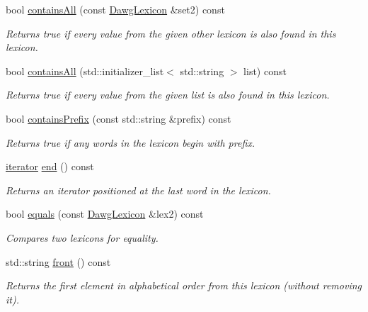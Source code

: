 \begin{DoxyCompactItemize}
bool \mbox{\hyperlink{classDawgLexicon_acda62a676d80199487fe846670f6294a}{contains\+All}} (const \mbox{\hyperlink{classDawgLexicon}{Dawg\+Lexicon}} \&set2) const
\begin{DoxyCompactList}\small\item\em Returns {\ttfamily true} if every value from the given other lexicon is also found in this lexicon. \end{DoxyCompactList}\item 
bool \mbox{\hyperlink{classDawgLexicon_a3934298595e72e6540e5f81d47ab763a}{contains\+All}} (std\+::initializer\+\_\+list$<$ std\+::string $>$ list) const
\begin{DoxyCompactList}\small\item\em Returns {\ttfamily true} if every value from the given list is also found in this lexicon. \end{DoxyCompactList}\item 
bool \mbox{\hyperlink{classDawgLexicon_a0b8e0b0b6f72ba6b88b56bd074b1dc32}{contains\+Prefix}} (const std\+::string \&prefix) const
\begin{DoxyCompactList}\small\item\em Returns true if any words in the lexicon begin with {\ttfamily prefix}. \end{DoxyCompactList}\item 
\mbox{\hyperlink{classDawgLexicon_1_1iterator}{iterator}} \mbox{\hyperlink{classDawgLexicon_a68b688a51bd0cf6fb5bc2cba292209a8}{end}} () const
\begin{DoxyCompactList}\small\item\em Returns an iterator positioned at the last word in the lexicon. \end{DoxyCompactList}\item 
bool \mbox{\hyperlink{classDawgLexicon_a548d3aa2e2086be0f8db9868d5dfd6e1}{equals}} (const \mbox{\hyperlink{classDawgLexicon}{Dawg\+Lexicon}} \&lex2) const
\begin{DoxyCompactList}\small\item\em Compares two lexicons for equality. \end{DoxyCompactList}\item 
std\+::string \mbox{\hyperlink{classDawgLexicon_a054217ec9f3229ceedee9d7bde075587}{front}} () const
\begin{DoxyCompactList}\small\item\em Returns the first element in alphabetical order from this lexicon (without removing it). \end{DoxyCompactList}\item 

\end{DoxyCompactItemize}
